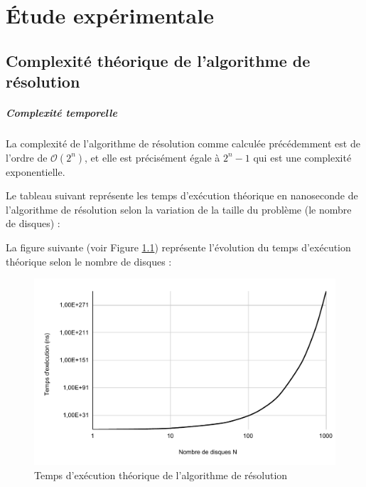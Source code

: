 \chapter{Étude expérimentale}

\section{Complexité théorique de l'algorithme de résolution}
\paragraph{Complexité temporelle}
La complexité de l'algorithme de résolution comme calculée précédemment est de l'ordre de $\mathcal{O}(2^{n})$, et elle est précisément égale à $2^{n} - 1$ qui est une complexité exponentielle.
\par
Le tableau suivant représente les temps d'exécution théorique en nanoseconde de l'algorithme de résolution selon la variation de la taille du problème (le nombre de disques) :

\small
\begin{center}
\end{center}

La figure suivante (voir Figure \ref{fig:temps_exec_th_algo_reso}) représente l'évolution du temps d'exécution théorique selon le nombre de disques :

\begin{figure}[H]
    \centering
        \includegraphics[scale=0.5]{./ressources/temps_execution_th_algo_reso.pdf}
        \caption{Temps d'exécution théorique de l'algorithme de résolution}
    \label{fig:temps_exec_th_algo_reso}
\end{figure} 

